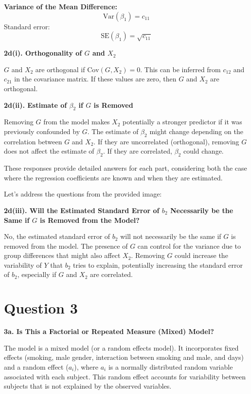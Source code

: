 \documentclass{article}
\begin{document}
\textbf{Variance of the Mean Difference:}
\[ \text{Var}(\beta_1) = c_{11} \]
Standard error:
\[ \text{SE}(\beta_1) = \sqrt{c_{11}} \]

\textbf{2d(i). Orthogonality of \(G\) and \(X_2\)}

\(G\) and \(X_2\) are orthogonal if \( \text{Cov}(G, X_2) = 0 \). This can be inferred from \( c_{12} \) and \( c_{21} \) in the covariance matrix. If these values are zero, then \(G\) and \(X_2\) are orthogonal.

\textbf{2d(ii). Estimate of \(\beta_2\) if \(G\) is Removed}

Removing \(G\) from the model makes \(X_2\) potentially a stronger predictor if it was previously confounded by \(G\). The estimate of \(\beta_2\) might change depending on the correlation between \(G\) and \(X_2\). If they are uncorrelated (orthogonal), removing \(G\) does not affect the estimate of \(\beta_2\). If they are correlated, \( \beta_2 \) could change.

These responses provide detailed answers for each part, considering both the case where the regression coefficients are known and when they are estimated.

Let's address the questions from the provided image:

\textbf{2d(iii). Will the Estimated Standard Error of \(b_2\) Necessarily be the Same if \(G\) is Removed from the Model?}

No, the estimated standard error of \(b_2\) will not necessarily be the same if \(G\) is removed from the model. The presence of \(G\) can control for the variance due to group differences that might also affect \(X_2\). Removing \(G\) could increase the variability of \(Y\) that \(b_2\) tries to explain, potentially increasing the standard error of \(b_2\), especially if \(G\) and \(X_2\) are correlated.

\section{Question 3}

\textbf{3a. Is This a Factorial or Repeated Measure (Mixed) Model?}

The model is a mixed model (or a random effects model). It incorporates fixed effects (smoking, male gender, interaction between smoking and male, and days) and a random effect (\(a_i\)), where \(a_i\) is a normally distributed random variable associated with each subject. This random effect accounts for variability between subjects that is not explained by the observed variables.
\end{document}

